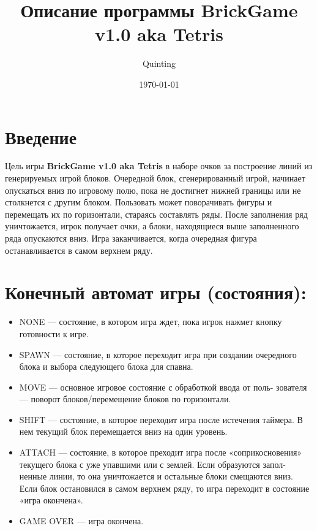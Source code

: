 \documentclass{article}
\title{Описание программы BrickGame v1.0 aka Tetris}
\author{Quinting}
\date{\today}
\begin{document}
\maketitle

\section{Введение}

Цель игры \textbf{BrickGame v1.0 aka Tetris} в наборе очков за построение линий
\newline из генерируемых игрой блоков. Очередной блок, сгенерированный игрой, 
\newline начинает опускаться вниз по игровому полю, пока не достигнет нижней 
\newline границы или не столкнется с другим блоком. Пользовать может поворачивать
\newline фигуры и перемещать их по горизонтали, стараясь составлять ряды. После 
\newline заполнения ряд уничтожается, игрок получает очки, а блоки, находящиеся 
\newline выше заполненного ряда опускаются вниз. Игра заканчивается, когда 
\newline очередная фигура останавливается в самом верхнем ряду.

\section{Конечный автомат игры (состояния): }
\begin{itemize}
    \item NONE — состояние, в котором игра ждет, пока игрок нажмет кнопку
    \newline готовности к игре.
    \item SPAWN — состояние, в которое переходит игра при создании очередного
    \newline блока и выбора следующего блока для спавна.
    \item MOVE — основное игровое состояние с обработкой ввода от поль-
    \newline зователя — поворот блоков/перемещение блоков по горизонтали.
    \item SHIFT — состояние, в которое переходит игра после истечения таймера. 
    \newline В нем текущий блок перемещается вниз на один уровень.
    \item ATTACH — состояние, в которое преходит игра после «соприкосновения»
    \newline текущего блока с уже упавшими или с землей. Если образуются запол-
    \newline ненные линии, то она уничтожается и остальные блоки смещаются вниз. 
    \newline Если блок остановился в самом верхнем ряду, то игра переходит в 
    \newline состояние «игра окончена».
    \item GAME OVER — игра окончена.
\end{itemize}
\end{document}
